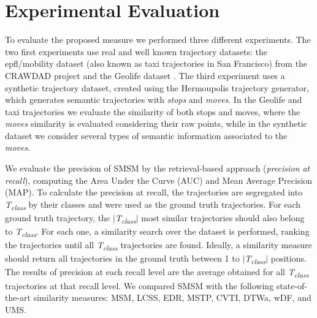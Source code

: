 %



\chapter[Experiments]{Experimental Evaluation}\label{sec:experiments}

\begin{flushright}
     
\end{flushright}

To evaluate the proposed measure we performed {three different experiments. The two first experiments use real and well known trajectory datasets: the epfl/mobility dataset (also known as taxi trajectories in San Francisco) from the CRAWDAD project }\cite{epfl-mobility-20090224}{ and the Geolife dataset }\cite{zheng2009mining}{. The third experiment uses a synthetic trajectory dataset, created using the Hermoupolis }\cite{Pelekis-Hermoupolis}{ trajectory generator, which generates semantic trajectories with \emph{stops} and \emph{moves}. In the Geolife and taxi trajectories we evaluate the similarity of both stops and moves, where the \emph{moves} similarity is evaluated considering their raw points, while in the synthetic dataset we consider several types of semantic information associated to the \emph{moves}.}

We evaluate the precision of SMSM by the retrieval-based approach (\textit{precision at recall}), computing the Area Under the Curve (AUC) and Mean Average Precision (MAP). To calculate the precision at recall, the trajectories are segregated into \textit{T\textsubscript{class}} by their classes and were used as the ground truth trajectories. For each ground truth trajectory, the $|$\textit{T\textsubscript{class}}$|$ most similar trajectories should also belong to \textit{T\textsubscript{class}}. For each one, a similarity search over the dataset is performed, ranking the trajectories until all \textit{T\textsubscript{class}} trajectories are found. Ideally, a similarity measure should return all trajectories in the ground truth between 1 to $|$\textit{T\textsubscript{class}}$|$ positions. The results of precision at each recall level are the average obtained for all \textit{T\textsubscript{class}} trajectories at that recall level. {We compared SMSM with the following state-of-the-art similarity measures: MSM, LCSS, EDR, MSTP, CVTI, DTWa, wDF, and UMS.}

